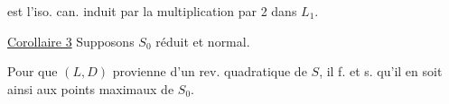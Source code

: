 est l'iso. can. induit par la multiplication par 2 dans $L_1$.

\uline{Corollaire 3} Supposons $S_0$ réduit et normal.

Pour que $(L,D)$ provienne d'un rev. quadratique de $S$, il f. et s. qu'il en soit ainsi aux points  maximaux de $S_0$.
